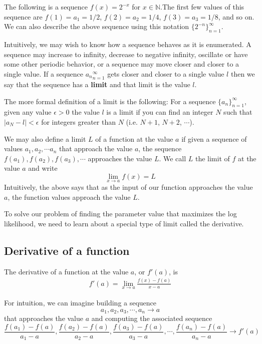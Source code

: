 \ex The following is a sequence $f(x) = 2^{-x}$ for $x \in \mathbb{N}$.The first few values of this sequence are $f(1) = a_{1} = 1/2$, $f(2) = a_{2} = 1/4$, $f(3) = a_{3} = 1/8$, and so on. We can also describe the above sequence using this notation $\{ 2^{-n} \}_{n=1}^{\infty}$.  

Intuitively, we may wish to know how a sequence behaves as it is enumerated. 
A sequence may increase to infinity, decrease to negative infinity, oscillate or have some other periodic behavior, or a sequence may move closer and closer to a single value. 
If a sequence ${a_{n}}_{n=1}^{\infty}$ gets closer and closer to a single value $l$ then we say that the sequence has a \textbf{limit} and that limit is the value $l$.

The more formal definition of a limit is the following:
For a sequence $\{a_{n}\}_{n=1}^{\infty}$, given any value $\epsilon >0$ the value $l$ is a limit if you can find an integer $N$ such that $|a_{N} - l| < \epsilon$ for integers greater than $N$ (i.e. $N+1$, $N+2$, $\cdots$).

We may also define a limit $L$ of a function at the value $a$ if given a sequence of values $a_{1}, a_{2}, \cdots a_{n}$ that approach the value $a$, the sequence $f(a_{1}), f(a_{2}), f(a_{3}), \cdots$ approaches the value $L$. We call $L$ the limit of $f$ at the value $a$ and write \begin{equation}
    \lim_{x \to a} f(x) = L
\end{equation}
Intuitively, the above says that as the input of our function approaches the value $a$, the function values approach the value $L$.

To solve our problem of finding the parameter value that maximizes the log likelihood, we need to learn about a special type of limit called the derivative.

\subsection{Derivative of a function}

The derivative of a function at the value $a$, or $f'(a)$, is 
\begin{align}
    f'(a) = \lim_{ x \to a } \frac{f(x) - f(a)}{x-a}
\end{align}

For intuition, we can imagine building a sequence
\begin{equation}
    a_{1},a_{2},a_{3},\cdots, a_{n} \to a
\end{equation} 
that approaches the value $a$ and computing the associated sequence
\begin{equation}
\frac{f(a_{1}) - f(a)}{a_{1}-a},\frac{f(a_{2}) - f(a)}{a_{2}-a},\frac{f(a_{3}) - f(a)}{a_{3}-a},\cdots,\frac{f(a_{n}) - f(a)}{a_{n}-a} \to f'(a)
\end{equation}

